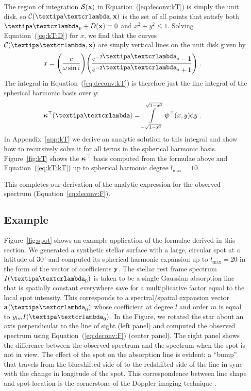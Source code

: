 \documentclass[modern]{aastex631}
\begin{document}
The region of integration $\mathcal{S}({\mathbf{x}})$ in Equation~(\ref{eq:deconv:kT}) is simply the unit disk, so $\Curve(\lnlam, \x)$ is the set of all points that satisfy both $\lnlam_0 + \D(\x) = 0$ and $x^2 + y^2 \le 1$.
Solving Equation~(\ref{eq:kT:D}) for $x$, we find that the curves $\Curve(\lnlam, \x)$ are simply vertical lines on the unit disk given by
%
\begin{align}
    x & =
    \Bigg(\frac{c}{\omega\sin i}\Bigg)
    \Bigg(\frac{\mathrm{e}^{-2{\lnlam_0}} - 1}
    {\mathrm{e}^{-2{\lnlam_0}} + 1}\Bigg)
    \quad .
\end{align}
%
The integral in Equation~(\ref{eq:deconv:kT}) is therefore just the line integral of the spherical harmonic basis over $y$:
%
\begin{align}
    \label{eq:kT:kT}
    \kT(\lnlam)
     & =
    \int\limits_{-\sqrt{1 - x^2}}^
    {\sqrt{1 - x^2}}
    \ylmbasis
    (x, y)
    \mathrm{d}y
    \quad .
\end{align}
%
In Appendix~\ref{app:kT} we derive an analytic solution to this integral and show how to recursively solve it for all terms in the spherical harmonic basis.
Figure~\ref{fig:kT} shows the $\boldsymbol{\kappa}^\top$ basis computed from the formulae above and Equation~(\ref{eq:kT:kT}) up to spherical harmonic degree $l_\mathrm{max}=10$.

This completes our derivation of the analytic expression for the observed spectrum (Equation~\ref{eq:deconv:F}).

\subsection{Example}
%
Figure~\ref{fig:spot} shows an example application of the formulae derived in this section. 
We generated a synthetic stellar surface with a large, circular spot at a latitude of $30^\circ$ and computed its spherical harmonic expansion up to $l_\mathrm{max}=20$ in the form of the vector of coefficients ${\mathbf{y}}$.
The stellar rest frame spectrum $I(\lnlam_0)$ is taken to be a single Gaussian absorption line that is spatially constant everywhere save for a multiplicative factor equal to the local spot intensity.
This corresponds to a spectral/spatial expansion vector $\alm(\lnlam_0)$ whose coefficient at degree $l$ and order $m$ is equal to $y_{lm} I(\lnlam_0)$.
In the Figure, we rotated the star about an axis perpendicular to the line of sight (left panel) and computed the observed spectrum using Equation~(\ref{eq:deconv:F}) (center panel). 
The right panel shows the difference between the observed spectrum and the spectrum when the spot is not in view.
The effect of the spot on the absorption line is evident: a ``bump'' that travels from the blueshifted side of to the redshifted side of the line in sync with the change in longitude of the spot. 
This correspondence between line shape and spot location is the cornerstone of the Doppler imaging technique \citep[compare to, e.g., Figures 1 and 4 in][]{Vogt1983}.
\end{document}
